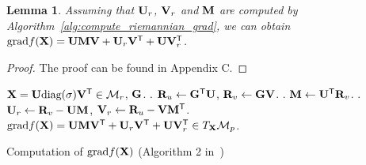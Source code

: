 \documentclass[letterpaper]{article} %
\newtheorem{lemma}{Lemma}
\newcommand\mycomment[1]{}
\def\ranksym{p}
\def\symp{r}
\def\M{\mathcal{M}}
\def\bR{{\bf R}}
\def\U{{\bf U}}
\def\V{{\bf V}}
\def\diag{\mbox{diag}}
\def\trsp{{\sf T}}
\def\G{{\bf G}}
\def\grad{{\text{grad}}}
\def\bM{{\bf M}}
\def\bI{{\bf I}}
\def\bX{{\bf X}}
\def\bI{{\bf I}}
\def\bX{{\bf X}}
\begin{document}
\begin{lemma}
  Assuming that $\U_{\symp}$, $\V_{\symp}$ and $\bM$ are computed by Algorithm~\ref{alg:compute_riemannian_grad},
  we can obtain {${\textnormal{grad}} f(\bX) = \U \bM \V + \U_{\symp} \V^{\trsp} + \U \V^{\trsp}_{\symp}$}.
\end{lemma}

\begin{proof}
  The proof can be found in Appendix C.
  \mycomment{
\begin{align}
\label{eq:proof_lemma1}
       & \grad f(\bX) \\
       & = \U \bM \V^{\trsp} + \U_{\symp} \V^{\trsp} + \U \V_{\symp}^{\trsp}  \nonumber \\
       & = \U(\U^{\trsp} \G \V) \V^{\trsp} + (\bR_{v} - \U \bM) \V^{\trsp} + \U (\bR_{u} - \V \bM^{\trsp})^{\trsp} \nonumber \\
       & = P_{\U} \G P_{V} + \G \V \V^{\trsp} - \U \bM \V^{\trsp} + \U \U^{\trsp} \G - \U \bM \V^{\trsp} \nonumber \\
       & = P_{\U} \G P_{V} + \G P_{V} - 2\U \bM \V^{\trsp} + P_{U} \G  \nonumber \\
       & = P_{\U} \G P_{V} + \G P_{V} - 2\U (\U^{\trsp} \bR_{v}) \V^{\trsp} + P_{U} \G  \nonumber \\
       & = P_{\U} \G P_{V} + \G P_{V} - 2\U (\U^{\trsp} \G \V) \V^{\trsp} + P_{U} \G  \nonumber \\
       & = P_{\U} \G P_{V} + (\bI - P_{U}) \G P_{V} + P_{U} \G (\bI - P_{V})  \nonumber \\
       & = P_{\U} \G P_{V} + P_{U}^{\perp} \G P_{V} + P_{U} \G P_{V}^{\perp}  ,
\end{align}
}
\end{proof}


\begin{algorithm}
  \begin{algorithmic}
    \REQUIRE $\bX = \U \diag(\sigma) \V^{\trsp} \in \M_{r}$, $\G$.
    . $\bR_{u} \leftarrow \G^{\trsp} \U$, $\bR_{v} \leftarrow \G \V$.
    . $\bM \leftarrow \U^{\trsp} \bR_{v}$.
    . $\U_{\symp} \leftarrow \bR_{v} - \U \bM$, $\V_{\symp} \leftarrow \bR_{u} - \V \bM^{\trsp}$.
    \ENSURE $\grad f(\bX) = \U \bM \V^{\trsp} + \U_{\symp} \V^{\trsp} + \U \V_{\symp}^{\trsp} \in T_{\bX}\M_{\ranksym}$.
  \end{algorithmic}
  \caption{Computation of $\grad f(\bX)$ (Algorithm 2 in~\cite{vandereycken2013lowrank})}
  \label{alg:compute_riemannian_grad}
\end{algorithm}
\end{document}
